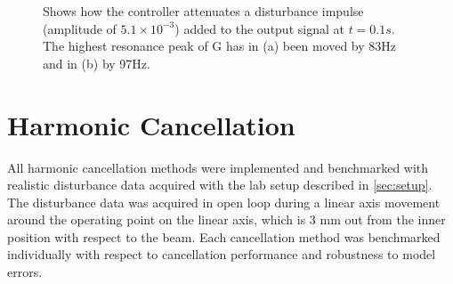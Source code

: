 \begin{figure}[h!]
  \centering %
  \qquad
  \caption{\label{fig:model_dist_high_order} Shows how the controller attenuates a disturbance impulse (amplitude of $5.1 \times 10^{-3}$) added to the output signal at $t=0.1s$. The highest resonance peak of G has in (a) been moved by 83Hz and in (b) by 97Hz.}
\end{figure}

\newpage
\FloatBarrier
\section{Harmonic Cancellation}
All harmonic cancellation methods were implemented and benchmarked with realistic disturbance data acquired with the lab setup described in \ref{sec:setup}. The disturbance data was acquired in open loop during a linear axis movement around the operating point on the linear axis, which is 3 mm out from the inner position with respect to the beam. Each cancellation method was benchmarked individually with respect to cancellation performance and robustness to model errors.

